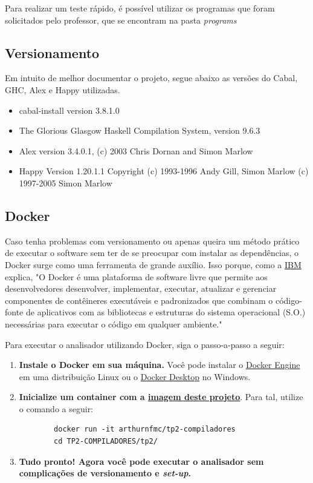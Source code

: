 \documentclass{article}
\begin{document}
Para realizar um teste rápido, é possível utilizar os programas que foram solicitados pelo professor, que se encontram na pasta \textit{programs}

\subsection{Versionamento}
Em intuito de melhor documentar o projeto, segue abaixo as versões do Cabal, GHC, Alex e Happy utilizadas.

\begin{itemize}
    \item cabal-install version 3.8.1.0
    \item The Glorious Glasgow Haskell Compilation System, version 9.6.3
    \item Alex version 3.4.0.1, (c) 2003 Chris Dornan and Simon Marlow
    \item Happy Version 1.20.1.1 Copyright (c) 1993-1996 Andy Gill, Simon Marlow (c) 1997-2005 Simon Marlow
\end{itemize}

\subsection{Docker}
Caso tenha problemas com versionamento ou apenas queira um método prático de executar o software sem ter de se preocupar com instalar as dependências, o Docker surge como uma ferramenta de grande auxílio. Isso porque, como a \href{https://www.ibm.com/br-pt/topics/docker}{IBM} explica, "O Docker é uma plataforma de software livre que permite aos desenvolvedores desenvolver, implementar, executar, atualizar e gerenciar componentes de contêineres executáveis e padronizados que combinam o código-fonte de aplicativos com as bibliotecas e estruturas do sistema operacional (S.O.) necessárias para executar o código em qualquer ambiente."

Para executar o analisador utilizando Docker, siga o passo-a-passo a seguir:

\begin{enumerate}
    \item \textbf{Instale o Docker em sua máquina.} Você pode instalar o \href{https://docs.docker.com/engine/install/ubuntu/}{Docker Engine} em uma distribuição Linux ou o \href{https://www.docker.com/products/docker-desktop/}{Docker Desktop} no Windows.
    \item \textbf{Inicialize um container com a \href{https://hub.docker.com/repository/docker/arthurnfmc/tp2-compiladores/general}{imagem deste projeto}}. Para tal, utilize o comando a seguir:
        \begin{verbatim}
        docker run -it arthurnfmc/tp2-compiladores
        cd TP2-COMPILADORES/tp2/
        \end{verbatim}
    \item \textbf{Tudo pronto! Agora você pode executar o analisador sem complicações de versionamento e \textit{set-up}.}
\end{enumerate}
\end{document}
